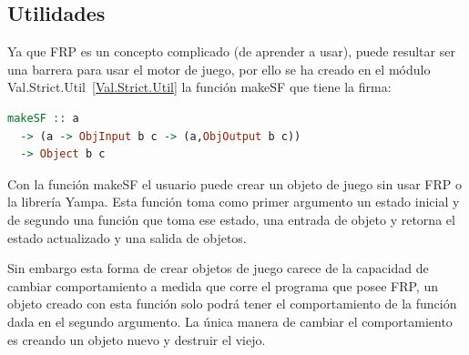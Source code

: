 \subsection{Utilidades}

Ya que FRP es un concepto complicado (de aprender a usar), puede resultar ser una barrera para usar el motor de juego, por ello se ha creado en el módulo Val.Strict.Util~\ref{Val.Strict.Util} la función makeSF que tiene la firma:

\begin{lstlisting}[frame=single,language=Haskell]
makeSF :: a
  -> (a -> ObjInput b c -> (a,ObjOutput b c))
  -> Object b c
\end{lstlisting}

Con la función makeSF el usuario puede crear un objeto de juego sin usar FRP o la librería Yampa. Esta función toma como primer argumento un estado inicial y de segundo una función que toma ese estado, una entrada de objeto y retorna el estado actualizado y una salida de objetos.

Sin embargo esta forma de crear objetos de juego carece de la capacidad de cambiar comportamiento a medida que corre el programa que posee FRP, un objeto creado con esta función solo podrá tener el comportamiento de la función dada en el segundo argumento. La única manera de cambiar el comportamiento es creando un objeto nuevo y destruir el viejo.
